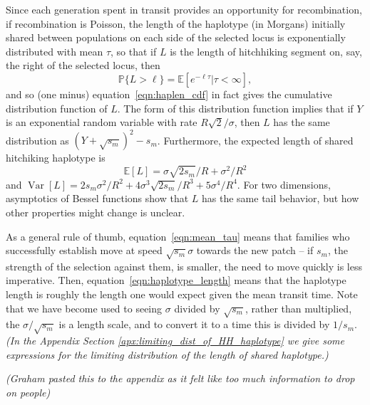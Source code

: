 \documentclass{article}
\DeclareMathOperator{\var}{Var}
\renewcommand{\P}{\mathbb{P}}
\newcommand{\E}{\mathbb{E}}
\newcommand{\gc}[1]{{\it\color{green}(#1)} }
\begin{document}
Since each generation spent in transit provides an opportunity for recombination,
if recombination is Poisson, the length of the haplotype (in Morgans)
initially shared between populations on each side of the selected locus is exponentially distributed
with mean $\tau$, so that if $L$ is the length of hitchhiking segment on, say, the right of
the selected locus, then
\begin{equation} \label{eqn:haplen_cdf2}
\P\{L>\ell\} = \E[e^{-\ell \tau}|\tau<\infty] ,
\end{equation}
and so (one minus) equation~\eqref{eqn:haplen_cdf} in fact gives the cumulative distribution function of $L$.
The form of this distribution function implies that if $Y$ is an exponential random variable with rate $R\sqrt{2}/\sigma$,
then $L$ has the same distribution as $(Y + \sqrt{s_m})^2 - s_m$.
Furthermore, the expected length of shared hitchiking haplotype is
\begin{equation} \label{eqn:haplotype_length}
\E[L] = \sigma \sqrt{2s_m}/R + \sigma^2/R^2
\end{equation}
and $\var[L] = 2s_m\sigma^2/R^2 + 4 \sigma^3 \sqrt{2s_m}/R^3 + 5 \sigma^4 / R^4$.
For two dimensions, asymptotics of Bessel functions show that $L$ has the same tail behavior,
but how other properties might change is unclear. 

As a general rule of thumb, equation~\eqref{eqn:mean_tau} means that families who successfully establish
move at speed $\sqrt{s_m} \sigma$ towards the new patch 
-- if $s_m$, the strength of the selection against them, is smaller, the need to move quickly is less imperative.
Then, equation~\eqref{eqn:haplotype_length} means that the haplotype length
is roughly the length one would expect given the mean transit time.
Note that we have become used to seeing $\sigma$ divided by $\sqrt{s_m}$, rather than multiplied,
the $\sigma/\sqrt{s_m}$ is a length scale, and to convert it to a time this is divided by $1/s_m$.
\gc{In the Appendix Section \ref{apx:limiting_dist_of_HH_haplotype} we
  give some expressions for the limiting distribution of
  the length of shared haplotype.}

\gc{Graham pasted this to the appendix as it felt like too much information to drop on
  people}


\end{document}
